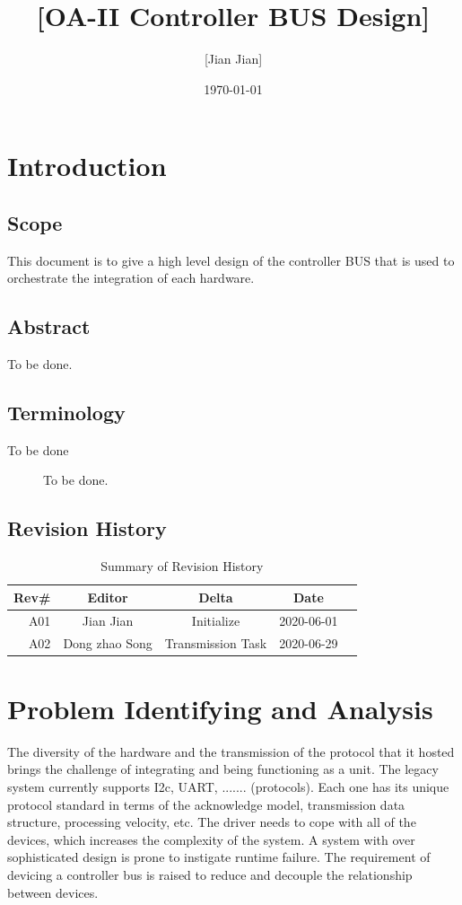 \documentclass[12pt,article]{memoir}
\title{[OA-II Controller BUS Design]}
\author{[Jian Jian]}
\date{\today}
\begin{document}
	


\tableofcontents*
\clearpage


\chapter{Introduction}
\section{Scope}
This document is to give a high level design of the controller BUS that is used to orchestrate the integration of each hardware. 

\section{Abstract}
To be done. 

\section{Terminology}
\begin{description}
	\item[To be done] To be done. 
\end{description}

\section{Revision History}
\begin{table}[H]
	\centering
	\begin{tabu}{r || c | c | c | c }
		Rev\# & Editor & Delta & Date\\ \hline
		A01 & Jian Jian & Initialize & 2020-06-01\\\hline
		A02 & Dong zhao Song & Transmission Task & 2020-06-29\\\hline
	\end{tabu}
	\caption{Summary of Revision History}
	\label{tab:rev}
\end{table}
\newpage

\chapter{Problem Identifying and Analysis}
The diversity of the hardware and the transmission of the protocol that it hosted brings the challenge of integrating and being functioning as a unit. The legacy system currently supports I2c, UART, ....... (protocols). Each one has its unique protocol standard in terms of the acknowledge model, transmission data structure, processing velocity, etc. The driver needs to cope with all of the devices, which increases the complexity of the system. A system with over sophisticated design is prone to instigate runtime failure. The requirement of devicing a controller bus is raised to reduce and decouple the relationship between devices.
\end{document}
